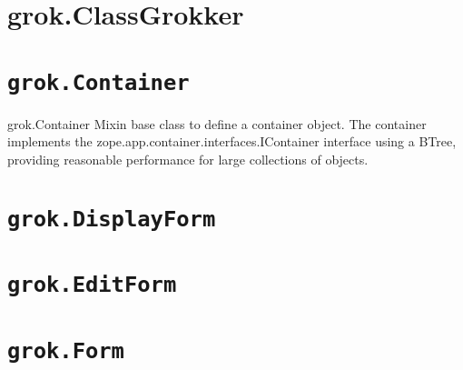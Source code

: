 \documentclass[10pt,a4paper,english]{manual}
\begin{document}

\section{grok.ClassGrokker}



\section{\texttt{grok.Container}}
\begin{classdesc*}{grok.Container}
Mixin base class to define a container object. The container implements the
zope.app.container.interfaces.IContainer interface using a BTree, providing
reasonable performance for large collections of objects.
\end{classdesc*}



\section{\texttt{grok.DisplayForm}}



\section{\texttt{grok.EditForm}}



\section{\texttt{grok.Form}}


\end{document}
